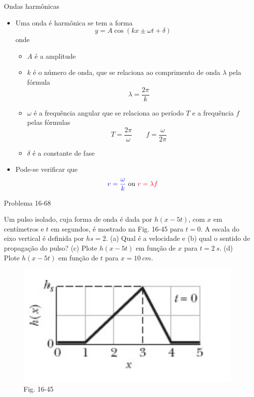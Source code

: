 \begin{frame}{Ondas harmônicas}
    \begin{itemize}
        \item Uma onda é harmônica se tem a forma
            \[
                y=A \cos{(kx \pm \omega t+ \delta)}
            \]
            onde
            \begin{itemize}
                \item \(A\) é a amplitude
                \item \(k\) é o número de onda, que se relaciona ao comprimento de onda 
                    \(\lambda\) pela fórmula
                    \[
                        \lambda = \frac{2\pi}{k}
                    \]
                \item \(\omega\) é a frequência angular que se relaciona ao período \(T\)
                    e a frequência \(f\) pelas fórmulas
                    \[
                        T=\frac{2\pi}{\omega} \qquad f=\frac{\omega}{2\pi}
                    \]
                \item \(\delta\) é a constante de fase
            \end{itemize}
        \item Pode-se verificar que
            \[
                {\color{blue} v=\frac{\omega}{k}} \text{ ou } {\color{red} v=\lambda f}
            \]
    \end{itemize}

\end{frame}

\begin{frame}{Problema 16-68}
    \begin{minipage}{\textwidth}
        Um pulso isolado, cuja forma de onda é dada por \(h(x - 5t)\), com \(x\) em centímetros e 
        \(t\) em segundos, é mostrado na Fig. 16-45 para \(t = 0\). A escala do eixo vertical é definida 
        por \(hs = 2\). (a) Qual é a velocidade e (b) qual o sentido de propagação do pulso? 
        (c) Plote \(h(x - 5t)\) em função de \(x\) para \(t = \SI{2}{s}\). (d) Plote \(h(x - 5t)\)
        em função de \(t\) para \(x = \SI{10}{cm}\).
    \end{minipage}

    \centering
    \begin{figure}
        \includegraphics[height=0.45\textheight]{images/Captura de tela de 2023-02-02 11-04-24.png}
        \caption{Fig. 16-45}
    \end{figure}
\end{frame}

